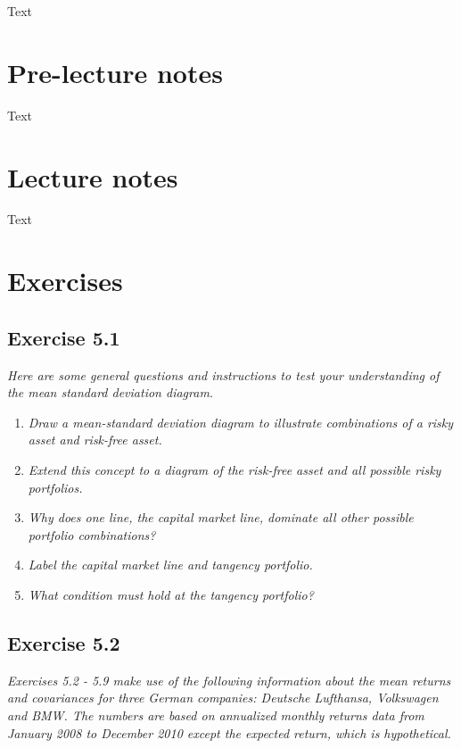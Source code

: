 \documentclass[]{book}
\theoremstyle{definition}
\theoremstyle{definition}
\theoremstyle{remark}
\begin{document}
Text

\section{Pre-lecture notes}\label{pre-lecture-notes-4}

Text

\section{Lecture notes}\label{lecture-notes-4}

Text

\section{Exercises}\label{exercises-4}

\subsection{Exercise 5.1}\label{exercise-5.1}

\emph{Here are some general questions and instructions to test your
understanding of the mean standard deviation diagram.}
\citep[p.159]{book}

\begin{enumerate}
\def\labelenumi{\alph{enumi}.}
\item
  \emph{Draw a mean-standard deviation diagram to illustrate
  combinations of a risky asset and risk-free asset.}
  \citep[p.159]{book}
\item
  \emph{Extend this concept to a diagram of the risk-free asset and all
  possible risky portfolios.} \citep[p.159]{book}
\item
  \emph{Why does one line, the capital market line, dominate all other
  possible portfolio combinations?} \citep[p.159]{book}
\item
  \emph{Label the capital market line and tangency portfolio.}
  \citep[p.159]{book}
\item
  \emph{What condition must hold at the tangency portfolio?}
  \citep[p.159]{book}
\end{enumerate}

\subsection{Exercise 5.2}\label{exercise-5.2}

\emph{Exercises 5.2 - 5.9 make use of the following information about
the mean returns and covariances for three German companies: Deutsche
Lufthansa, Volkswagen and BMW. The numbers are based on annualized
monthly returns data from January 2008 to December 2010 except the
expected return, which is hypothetical.} \citep[p.159]{book}
\end{document}
